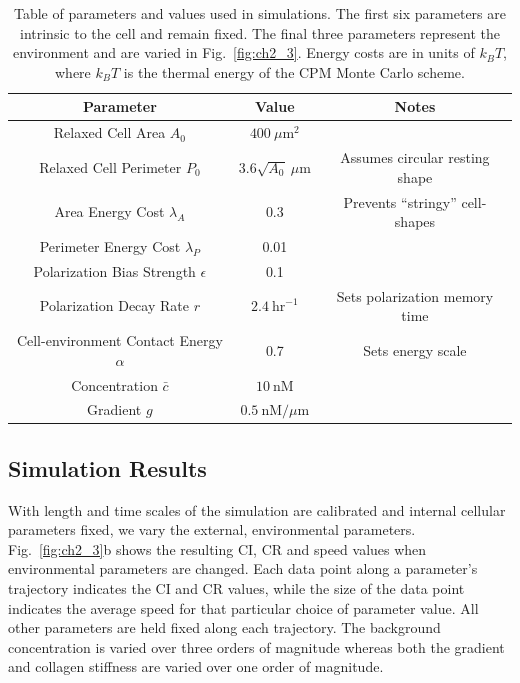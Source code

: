 \begin{table}[ht]
\begin{center}
\begin{tabular}{ |c|c|c| }
\hline
Parameter & Value & Notes \\ \hline
Relaxed Cell Area $A_0$ & $400 \ \mu\text{m}^2$ & \\ \hline
Relaxed Cell Perimeter $P_0$ & $3.6\sqrt{A_0} \ \mu\text{m}$ & Assumes circular resting shape \\ \hline
Area Energy Cost $\lambda_A$ & 0.3  & Prevents ``stringy'' cell-shapes \\
Perimeter Energy Cost $\lambda_P$ & 0.01 & \\ \hline
Polarization Bias Strength $\epsilon$ & 0.1 & \\ \hline
Polarization Decay Rate $r$ & $2.4 \ \text{hr}^{-1}$ & Sets polarization memory time \\ \hline \hline
Cell-environment Contact Energy $\alpha$ & 0.7 & Sets energy scale \\ \hline
Concentration $\bar{c}$ & $10 \ \text{nM}$ & \\
Gradient $g$ & $0.5 \ \text{nM/}\mu\text{m}$ & \\ \hline
\end{tabular}
\caption{Table of parameters and values used in simulations. The first six parameters are intrinsic to the cell and remain fixed. The final three parameters represent the environment and are varied in Fig.\ \ref{fig:ch2_3}. Energy costs are in units of $k_B T$, where $k_B T$ is the thermal energy of the CPM Monte Carlo scheme.}
\label{table:ch2_1}
\end{center}
\end{table}


\subsection{Simulation Results}

With length and time scales of the simulation are calibrated and internal cellular parameters fixed, we vary the external, environmental parameters.    Fig.\ \ref{fig:ch2_3}b shows the resulting CI, CR and speed values when environmental parameters are changed. Each data point along a parameter's trajectory indicates the CI and CR values, while the size of the data point indicates the average speed for that particular choice of parameter value. All other parameters are held fixed along each trajectory. The background concentration is varied over three orders of magnitude whereas both the gradient and collagen stiffness are varied over one order of magnitude.

